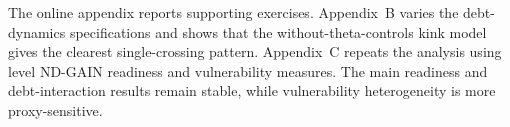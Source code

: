 The online appendix reports supporting exercises. Appendix~B varies the debt-dynamics specifications and shows that the without-theta-controls kink model gives the clearest single-crossing pattern. Appendix~C repeats the analysis using level ND-GAIN readiness and vulnerability measures. The main readiness and debt-interaction results remain stable, while vulnerability heterogeneity is more proxy-sensitive.

